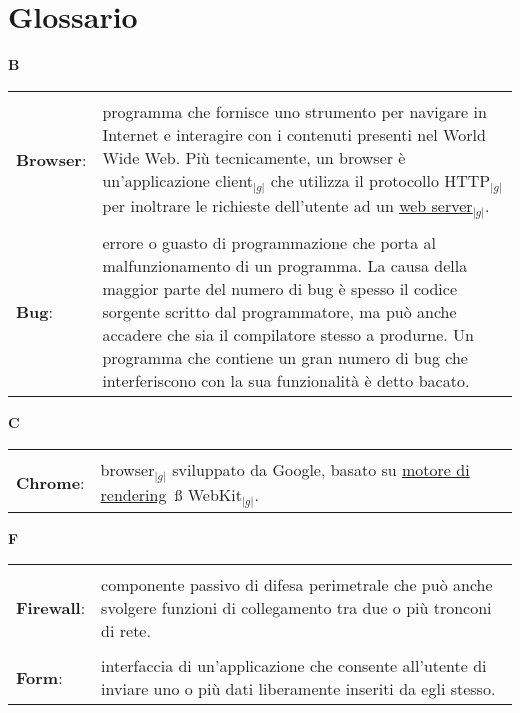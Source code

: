 \appendix
\addappheadtotoc
\section{Glossario}\label{appendice}

\hfill\Huge{\textbf{B}}\\
\normalsize
	\begin{longtable}{p{} p{}} 
	    \toprule
	    \\
		    \textbf{Browser}:		&	programma che fornisce uno strumento per navigare in Internet e interagire con i contenuti presenti nel World Wide Web. Più tecnicamente, un browser è 
						un’applicazione client$_{|g|}$ che utilizza il protocollo HTTP$_{|g|}$ per inoltrare le richieste dell’utente ad un \underline{web server}$_{|g|}$.\\
	    \\
	    \textbf{Bug}:		&	errore o guasto di programmazione che porta al malfunzionamento di un programma. La causa della maggior parte del numero di bug è spesso il
						codice sorgente scritto dal programmatore, ma può anche accadere che sia il compilatore stesso a produrne. Un programma che contiene un gran numero
						di bug che interferiscono con la sua funzionalità è detto bacato.\\
	\end{longtable}

\hfill\Huge{\textbf{C}}\\	
\normalsize
	\begin{longtable}{p{} p{}} 
	    \toprule
	    \\
	  \textbf{Chrome}: &	browser$_{|g|}$ sviluppato da Google, basato su \underline{motore di rendering}\g~ß WebKit$_{|g|}$.\\
	
	\end{longtable}
	
\hfill\Huge{\textbf{F}}\\	
\normalsize
	\begin{longtable}{p{} p{}} 
	    \toprule
	    \\	
	\textbf{Firewall}: &	
	componente passivo di difesa perimetrale che può anche svolgere funzioni di collegamento tra due o più tronconi di rete.\\
	\\
	\textbf{Form}: &
	
	interfaccia di un'applicazione che consente all'utente di inviare uno o più dati liberamente inseriti da egli stesso.\\
	\end{longtable}
	
